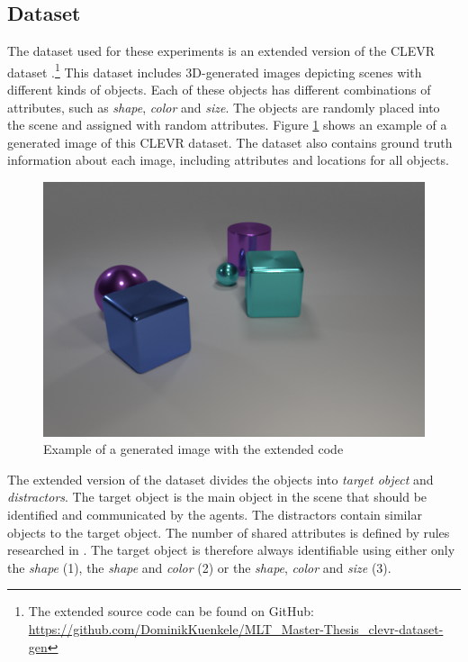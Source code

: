 \documentclass[11pt]{article}
\begin{document}
\subsection{Dataset}
The dataset used for these experiments is an extended version of the CLEVR dataset \citep{Johnson2016}.\footnote{The extended source code can be found on GitHub: \href{https://github.com/DominikKuenkele/MLT\_Master-Thesis\_clevr-dataset-gen}{https://github.com/DominikKuenkele/MLT\_Master-Thesis\_clevr-dataset-gen}} This dataset includes 3D-generated images depicting scenes with different kinds of objects. Each of these objects has different combinations of attributes, such as \emph{shape}, \emph{color} and \emph{size}. The objects are randomly placed into the scene and assigned with random attributes.
Figure \ref{fig:clevr-extended_example} shows an example of a generated image of this CLEVR dataset. The dataset also contains ground truth information about each image, including attributes and locations for all objects.

\begin{figure}[h]
  \centering
  \includegraphics[width=.8\linewidth]{figures/CLEVR_extended_example.png}
  \caption{Example of a generated image with the extended code}
  \label{fig:clevr-extended_example}
\end{figure}

The extended version of the dataset divides the objects into \emph{target object} and \emph{distractors}. The target object is the main object in the scene that should be identified and communicated by the agents. The distractors contain similar objects to the target object. The number of shared attributes is defined by rules researched in \citet{Dale1995}. The target object is therefore always identifiable using either only the \emph{shape} (1), the \emph{shape} and \emph{color} (2) or the \emph{shape}, \emph{color} and \emph{size} (3).
\end{document}
